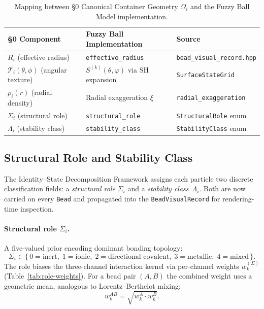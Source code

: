 \documentclass[12pt, a4paper, oneside]{article}
\newcommand{\file}[1]{\texttt{#1}}
\newcommand{\type}[1]{\texttt{#1}}
\newcommand{\field}[1]{\texttt{#1}}
\begin{document}
\begin{table}[htbp]
  \centering
  \caption{Mapping between §0 Canonical Container Geometry
           $\Omega_i$ and the Fuzzy Ball Model implementation.}
  \label{tab:omega-mapping}
  \begin{tabular}{lll}
    \toprule
    §0 Component & Fuzzy Ball Implementation & Source \\
    \midrule
    $R_i$ (effective radius)
      & \field{effective\_radius}
      & \file{bead\_visual\_record.hpp} \\
    $\mathcal{T}_i(\theta,\phi)$ (angular texture)
      & $S^{(k)}(\theta,\varphi)$ via SH expansion
      & \type{SurfaceStateGrid} \\
    $\rho_i(r)$ (radial density)
      & Radial exaggeration $\xi$
      & \field{radial\_exaggeration} \\
    $\Sigma_i$ (structural role)
      & \field{structural\_role}
      & \type{StructuralRole} enum \\
    $\Lambda_i$ (stability class)
      & \field{stability\_class}
      & \type{StabilityClass} enum \\
    \bottomrule
  \end{tabular}
\end{table}

\subsection{Structural Role and Stability Class}
\label{sec:role-stability}

The Identity--State Decomposition Framework assigns each particle
two discrete classification fields: a \emph{structural role}
$\Sigma_i$ and a \emph{stability class}~$\Lambda_i$.  Both are now
carried on every \type{Bead} and propagated into the
\type{BeadVisualRecord} for rendering-time inspection.

\paragraph{Structural role $\Sigma_i$.}
A five-valued prior encoding dominant bonding topology:
%
\[
  \Sigma_i \in
  \bigl\{\,
    0\!=\!\text{inert},\;
    1\!=\!\text{ionic},\;
    2\!=\!\text{directional covalent},\;
    3\!=\!\text{metallic},\;
    4\!=\!\text{mixed}
  \,\bigr\}.
\]
%
The role biases the three-channel interaction kernel via per-channel
weights $w_k^{(\Sigma)}$ (Table~\ref{tab:role-weights}).  For a
bead pair $(A,B)$ the combined weight uses a geometric mean,
analogous to Lorentz--Berthelot mixing:
%
\begin{equation}
  w_k^{AB} = \sqrt{w_k^A \cdot w_k^B}.
  \label{eq:role-mix}
\end{equation}
\end{document}
